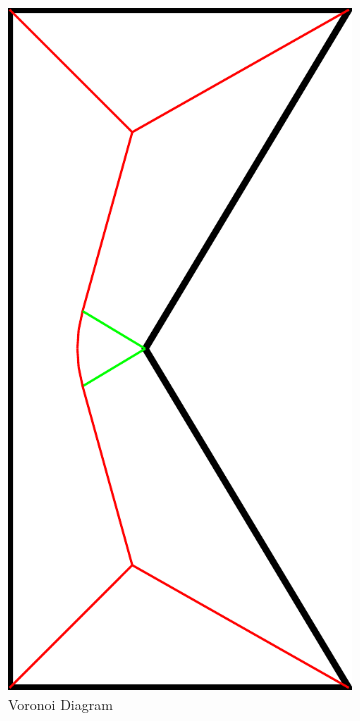 \begin{figure}
\begin{subfigure}{\figwidth}
\end{subfigure}
\begin{subfigure}{\figwidth}\centering
\includegraphics[height=\figwidthTwo]{sources/method/simple_skeleton_vd}
\caption{Voronoi Diagram}\label{shape_decomposition_vd}
\end{subfigure}
\begin{subfigure}{\figwidth}\centering

\end{subfigure}
\end{figure}
